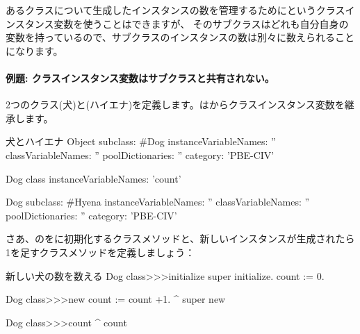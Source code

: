 \documentclass[a4paper,10pt,twoside]{book}
\begin{document}
あるクラスについて生成したインスタンスの数を管理するためにというクラスインスタンス変数を使うことはできますが、
そのサブクラスはどれも自分自身の変数を持っているので、サブクラスのインスタンスの数は別々に数えられることになります。

\paragraph{例題: クラスインスタンス変数はサブクラスと共有されない。}
2つのクラス(犬)と(ハイエナ)を定義します。はからクラスインスタンス変数を継承します。

\begin{classdef}[dog]{犬とハイエナ}
Object subclass: #Dog
	instanceVariableNames: ''
	classVariableNames: ''
	poolDictionaries: ''
	category: 'PBE-CIV'

Dog class
	instanceVariableNames: 'count'

Dog subclass: #Hyena
	instanceVariableNames: ''
	classVariableNames: ''
	poolDictionaries: ''
	category: 'PBE-CIV'
\end{classdef}

さあ、のをに初期化するクラスメソッドと、新しいインスタンスが生成されたら1を足すクラスメソッドを定義しましょう：
\begin{method}[dogcount]{新しい犬の数を数える}
Dog class>>>initialize
	super initialize.
	count := 0.

Dog class>>>new
	count := count +1.
	^ super new

Dog class>>>count
	^ count
\end{method}
\end{document}
